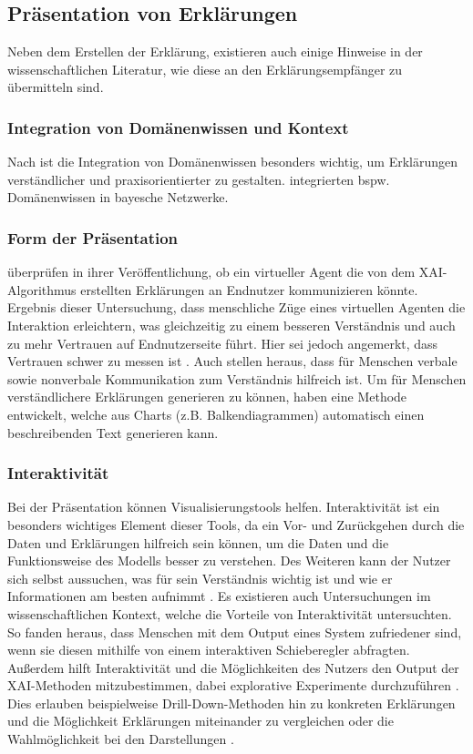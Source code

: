 \subsection{Präsentation von Erklärungen}
Neben dem Erstellen der Erklärung, existieren auch einige Hinweise in der wissenschaftlichen Literatur, wie diese an den Erklärungsempfänger zu übermitteln sind.
\subsubsection{Integration von Domänenwissen und Kontext}
Nach \cite{zhou20182d} ist die Integration von Domänenwissen besonders wichtig, um Erklärungen verständlicher und praxisorientierter zu gestalten. \cite{sun2005explanation} integrierten bspw. Domänenwissen in bayesche Netzwerke.

\subsubsection{Form der Präsentation}
\cite{weitz2019you} überprüfen in ihrer Veröffentlichung, ob ein virtueller Agent die von dem XAI-Algorithmus erstellten Erklärungen an Endnutzer kommunizieren könnte. Ergebnis dieser Untersuchung, dass menschliche Züge eines virtuellen Agenten die Interaktion erleichtern, was gleichzeitig zu einem besseren Verständnis und auch zu mehr Vertrauen auf Endnutzerseite führt. Hier sei jedoch angemerkt, dass Vertrauen schwer zu messen ist \cite{weitz2019you}.  Auch \cite{vaughan2020human} stellen heraus, dass für Menschen verbale sowie nonverbale Kommunikation zum Verständnis hilfreich ist.
Um für Menschen verständlichere Erklärungen generieren zu können, haben \cite{kim2020answering} eine Methode entwickelt, welche aus Charts (z.B. Balkendiagrammen) automatisch einen beschreibenden Text generieren kann.

\subsubsection{Interaktivität}
Bei der Präsentation können Visualisierungstools helfen. Interaktivität ist ein besonders wichtiges Element dieser Tools, da ein Vor- und Zurückgehen durch die Daten und Erklärungen hilfreich sein können, um die Daten und die Funktionsweise des Modells besser zu verstehen. Des Weiteren kann der Nutzer sich selbst aussuchen, was für sein Verständnis wichtig ist und wie er Informationen am besten aufnimmt \cite{vaughan2020human}. Es existieren auch Untersuchungen im wissenschaftlichen Kontext, welche die Vorteile von Interaktivität untersuchten. So fanden \cite{vaccaro2018illusion} heraus, dass Menschen mit dem Output eines System zufriedener sind, wenn sie diesen mithilfe von einem interaktiven Schieberegler abfragten. Außerdem hilft Interaktivität und die Möglichkeiten des Nutzers den Output der XAI-Methoden mitzubestimmen, dabei explorative Experimente durchzuführen \cite{weld2019challenge}. Dies erlauben beispielweise Drill-Down-Methoden hin zu konkreten Erklärungen und die Möglichkeit Erklärungen miteinander zu vergleichen oder die Wahlmöglichkeit bei den Darstellungen \cite{weld2019challenge}.

